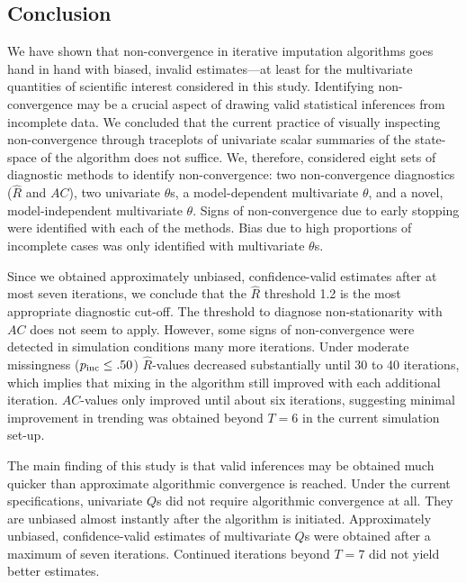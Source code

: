 \documentclass[Royal,times,sageh]{sagej}
\begin{document}
\hypertarget{conclusion}{%
\subsection{Conclusion}\label{conclusion}}

We have shown that non-convergence in iterative imputation algorithms goes hand in hand with biased, invalid estimates---at least for the multivariate quantities of scientific interest considered in this study. Identifying non-convergence may be a crucial aspect of drawing valid statistical inferences from incomplete data. We concluded that the current practice of visually inspecting non-convergence through traceplots of univariate scalar summaries of the state-space of the algorithm does not suffice. We, therefore, considered eight sets of diagnostic methods to identify non-convergence: two non-convergence diagnostics (\(\widehat{R}\) and \(AC\)), two univariate \(\theta\)s, a model-dependent multivariate \(\theta\), and a novel, model-independent multivariate \(\theta\). Signs of non-convergence due to early stopping were identified with each of the methods. Bias due to high proportions of incomplete cases was only identified with multivariate \(\theta\)s.

Since we obtained approximately unbiased, confidence-valid estimates after at most seven iterations, we conclude that the \(\widehat{R}\) threshold 1.2 is the most appropriate diagnostic cut-off. The threshold to diagnose non-stationarity with \(AC\) does not seem to apply. However, some signs of non-convergence were detected in simulation conditions many more iterations. Under moderate missingness (\(p_{\rm inc}\leq.50\)) \(\widehat{R}\)-values decreased substantially until 30 to 40 iterations, which implies that mixing in the algorithm still improved with each additional iteration. \(AC\)-values only improved until about six iterations, suggesting minimal improvement in trending was obtained beyond \(T=6\) in the current simulation set-up.

The main finding of this study is that valid inferences may be obtained much quicker than approximate algorithmic convergence is reached. Under the current specifications, univariate \(Q\)s did not require algorithmic convergence at all. They are unbiased almost instantly after the algorithm is initiated. Approximately unbiased, confidence-valid estimates of multivariate \(Q\)s were obtained after a maximum of seven iterations. Continued iterations beyond \(T = 7\) did not yield better estimates.
\end{document}
